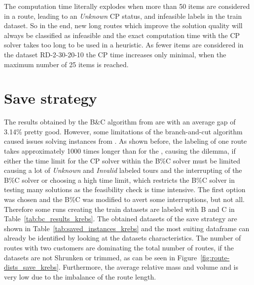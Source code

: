 The computation time literally explodes when more than 50 items are considered in a route, leading to an \textit{Unknown} \gls{CP} status, and
infeasible labels in the train dataset. So in the end, new long routes which improve the solution quality will always be classified as infeasible
and the exact computation time with the \gls{CP} solver takes too long to be used in a heuristic. As fewer items are considered in the dataset
RD-2-30-20-10 the \gls{CP} time increases only minimal, when the maximum number of 25 items is reached.

\section{Save strategy}
\label{sec:challenges_krebs_save}

The results obtained by the B\&C algorithm from \cite{tamke_branch-and-cut_2024} are with an average gap of 3.14\% pretty good. However, some limitations
of the branch-and-cut algorithm caused issues solving instances from \krebsADataSet. As shown before, the labeling of one route takes approximately
1000 times longer than for the \gendreauDataSet, causing the dilemma, if either the time limit for the \gls{CP} solver within the B\%C solver
must be limited causing a lot of \textit{Unknown} and \textit{Invalid} labeled tours and the interrupting of the B\%C solver or choosing
a high time limit, which restricts the B\%C solver in testing many solutions as the feasibility check is time intensive. The first option
was chosen and the B\%C was modified to avert some interruptions, but not all. Therefore some runs creating the train datasets are labeled with
B and C in Table~\ref{tab:bc_results_krebs}. The obtained datasets of the save strategy are shown in Table~\ref{tab:saved_instances_krebs}
and the most suiting dataframe can already be identified by looking at the datasets characteristics. The number of routes with two customers
are dominating the total number of routes, if the datasets are not Shrunken or trimmed, as can be seen in Figure~\ref{fig:route-dists_save_krebs}. Furthermore, the average relative mass and volume and
is very low due to the imbalance of the route length.

